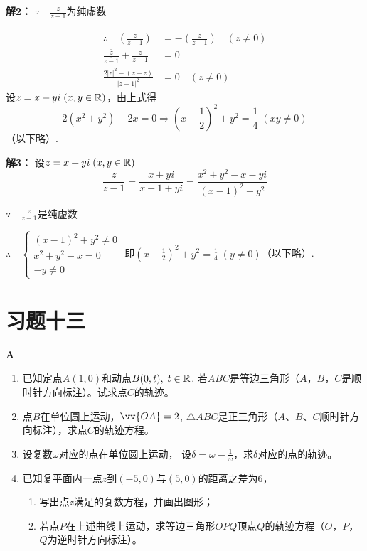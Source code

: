 \textbf{解2：}
$\because\quad \frac{z}{z-1}$为纯虚数

\[\begin{split}
    \therefore\quad \overline{\left(\frac{z}{z-1}\right)}&=-\left(\frac{z}{z-1}\right)\quad (z\ne 0)\\
    \frac{\bar z}{\overline{z-1}}+\frac{z}{z-1}&=0\\
    \frac{2|z|^2-(z+\bar z)}{|z-1|^2}&=0  \quad (z\ne 0)
\end{split}\]
设$z=x+yi\; (x,y\in\mathbb{R})$，由上式得
\[2(x^2+y^2)-2x=0\Rightarrow \left(x-\frac{1}{2}\right)^2+y^2=\frac{1}{4}\; (xy\ne 0)\]
（以下略）.

\textbf{解3：}
设$z=x+yi\; (x,y\in\mathbb{R})$
\[\frac{z}{z-1}=\frac{x+yi}{x-1+yi}=\frac{x^2+y^2-x-yi}{(x-1)^2+y^2}\]

$\because\quad \frac{z}{z-1}$是纯虚数

$\therefore\quad \begin{cases}
    (x-1)^2+y^2\ne 0\\
    x^2+y^2-x=0\\
    -y\ne 0
\end{cases}$
即$\left(x-\frac{1}{2}\right)^2+y^2=\frac{1}{4}\; (y\ne 0)$（以下略）.


\section*{习题十三}
\begin{center}
    \bfseries A
\end{center}
\begin{enumerate}
    \item 已知定点$A(1,0)$和动点$B(0,t),\; t\in\mathbb{R}$. 若$ABC$是等边三角形（$A$，$B$，$C$是顺时针方向标注）。试求点$C$的轨迹。
    \item 点$B$在单位圆上运动，$\vv{OA}=2$, $\triangle ABC$是正三角形（$A$、$B$、$C$顺时针方向标注），求点$C$的轨迹方程。
    \item 设复数$\omega$对应的点在单位圆上运动，
    设$\delta =\omega-\frac{1}{\omega}$，求$\delta$对应的点的轨迹。
   \item 已知复平面内一点$z$到$(-5,0)$与$(5,0)$的距离之差为6，
   \begin{enumerate}[(1)]
   \item 写出点$z$满足的复数方程，并画出图形；
   \item 若点$P$在上述曲线上运动，求等边三角形$OPQ$顶点$Q$的轨迹方程（$O$，$P$，$Q$为逆时针方向标注）。
   \end{enumerate}
\end{enumerate}



